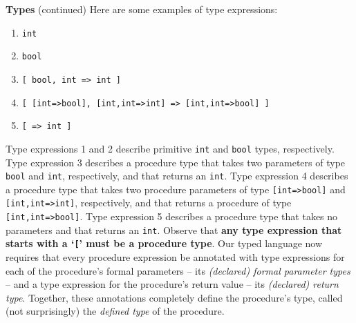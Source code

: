 \begin{minipage}[t]{\sw}
\slidenumber
\LARGE
{\bf Types} (continued)\exx
Here are some examples of type expressions:
{\Large
\begin{enumerate}
\setlength{\itemsep}{-0.4ex}
\item \verb'int'
\item \verb'bool'
\item \verb'[ bool, int => int ]'
\item \verb'[ [int=>bool], [int,int=>int] => [int,int=>bool] ]'
\item \verb'[ => int ]'
\end{enumerate}
}
Type expressions 1 and 2 describe primitive
\verb'int' and \verb'bool' types, respectively.
Type expression 3 describes a procedure type
that takes two parameters of type \verb'bool' and \verb'int', respectively,
and that returns an \verb'int'.
Type expression 4 describes a procedure type
that takes two procedure parameters
of type \verb'[int=>bool]' and \verb'[int,int=>int]',
respectively, and that returns a procedure
of type \verb'[int,int=>bool]'.
Type expression 5 describes a procedure type
that takes no parameters and that returns an \verb'int'.
Observe that {\bf any type expression that starts with a `\verb'[''
must be a procedure type}.\exx
Our typed language now requires
that every procedure expression be annotated
with type expressions for each of the procedure's formal parameters --
its {\em (declared) formal parameter types} --
and a type expression for the procedure's return value --
its {\em (declared) return type}.
Together, these annotations completely define the procedure's type,
called (not surprisingly) the {\em defined type} of the procedure.
\end{minipage}
